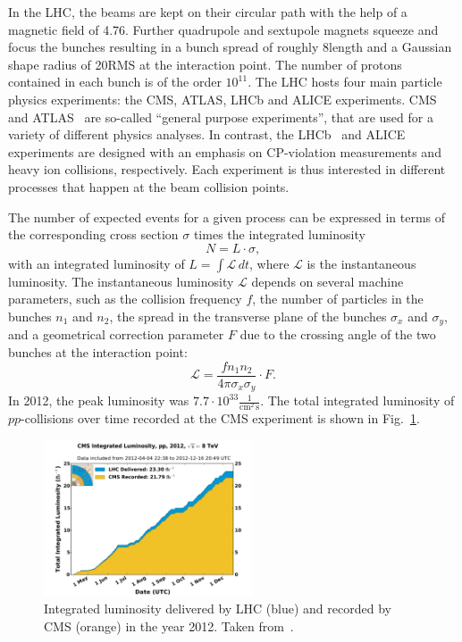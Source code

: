 In the LHC, the beams are kept on their circular path with the help of a magnetic field of 4.76\tesla.
Further quadrupole and sextupole magnets squeeze and focus the bunches resulting in a bunch spread of roughly 8\cm length and a Gaussian shape radius of 20\mum RMS at the interaction point.
The number of protons contained in each bunch is of the order $10^{11}$.
The LHC hosts four main particle physics experiments: the CMS, ATLAS, LHCb and ALICE experiments.
CMS~\cite{bib:CMS:experiment,bib:CMS:TDR} and ATLAS~\cite{bib:ATLAS:experiment,bib:ATLAS:TDR_1,bib:ATLAS:TDR_2} are so-called ``general purpose experiments'', that are used for a variety of different physics analyses.
In contrast, the LHCb~\cite{bib:LHCb:experiment} and ALICE~\cite{bib:ALICE:experiment} experiments are designed with an emphasis on CP-violation measurements and heavy ion collisions, respectively.
Each experiment is thus interested in different processes that happen at the beam collision points.

The number of expected events for a given process can be expressed in terms of the corresponding cross section $\sigma$ times the integrated luminosity
\begin{equation}
N = L \cdot \sigma,
\end{equation}
with an integrated luminosity of $L=\int \mathcal{L}\, dt$, where $\mathcal{L}$ is the instantaneous luminosity.
The instantaneous luminosity $\mathcal{L}$ depends on several machine parameters, such as the collision frequency $f$, the number of particles in the bunches $n_1$ and $n_2$,
the spread in the transverse plane of the bunches $\sigma_x$ and $\sigma_y$, and a geometrical correction parameter $F$ due to the crossing angle of the two bunches at the interaction point:
\begin{equation}
\mathcal{L} = \frac{f n_1 n_2 }{4 \pi \sigma_x \sigma_y} \cdot F.
\end{equation}
In 2012, the peak luminosity was $7.7 \cdot 10^{33} \frac{1}{\text{cm}^2\,\text{s}}$.
The total integrated luminosity of $pp$-collisions over time recorded at the CMS experiment is shown in Fig.~\ref{fig:Lumi}.
\begin{figure}[!b]
  \centering
      \includegraphics[width=0.55\textwidth]{figures/experiment/LHC/int_lumi_per_day_cumulative_pp_2012.pdf}
  \caption{Integrated luminosity delivered by LHC (blue) and recorded by CMS (orange) in the year 2012. Taken from~\cite{bib:LumiWiki}.}  
  \label{fig:Lumi}
\end{figure}

